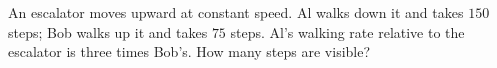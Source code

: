 An escalator moves upward at constant speed. Al walks down it and takes $150$ steps; Bob walks up it and takes $75$ steps. Al's walking rate relative to the escalator is three times Bob's. How many steps are visible?
